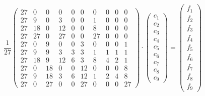 \[
\frac{1}{27}
\left(
\begin{array}{cccccccccc}
27 & 0& 0&0&0&0&0&0&0&0 \\
27 & 9 & 0 & 3 &0 &0 & 1 & 0 & 0 & 0 \\
27 & 18 & 0 & 12 & 0 & 0 & 8 &0 &0 &0   \\
27 & 27 & 0 & 27 &0 & 0 &27 &0 &0 &0    \\
27 & 0 & 9 & 0 & 0 & 3 & 0& 0& 0 & 1\\
27 & 9 & 9 & 3 & 3 & 3 & 1 & 1 & 1 & 1    \\
27 & 18 & 9 & 12 & 6 & 3 & 8  & 4  & 2  & 1    \\
27 & 0 & 18 & 0 & 0 & 12 & 0& 0& 0& 8  \\
27 & 9 & 18 & 3 & 6 & 12 & 1 & 2 & 4 & 8\\
27 & 0 & 27 & 0 & 0 &27 & 0 & 0 & 0 & 27  
\end{array}
\right)
\cdot
\left(
\begin{array}{c}
c_1 \\ c_2 \\ c_3 \\ c_4 \\ c_5 \\ c_6 \\ c_7 \\ c_8 \\ c_9
\end{array}
\right)
=
\left(
\begin{array}{c}
f_1 \\ f_2 \\ f_3 \\ f_4 \\ f_5 \\ f_6 \\ f_7 \\ f_8 \\ f_9
\end{array}
\right)
\]

